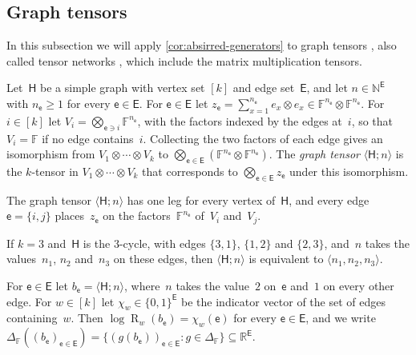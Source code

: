 \documentclass[11pt,letterpaper]{article}
\DeclareMathOperator{\tensorrank}{R}
\newcommand{\FF}{\mathbb{F}}
\newcommand{\RR}{\mathbb{R}}
\newcommand{\NN}{\mathbb{N}}
\begin{document}
\subsection{Graph tensors}\label{sec:graph-tensors}

In this subsection we will apply \cref{cor:absirred-generators} to graph tensors \cite{MR3924627}, also called tensor networks \cite[Definition~12.1]{wigderson2022asymptotic}, which include the matrix multiplication tensors.
\begin{definition}\label{def:graph-tensor}
Let~$\mathsf{H}$ be a simple graph with vertex set $[k]$ and edge set~$\mathsf{E}$, and let $n \in \NN^\mathsf{E}$ with $n_{\mathsf{e}} \geq 1$ for every $\mathsf{e} \in \mathsf{E}$. For $\mathsf{e} \in \mathsf{E}$ let $z_{\mathsf{e}} = \sum_{x=1}^{n_{\mathsf{e}}} e_x \otimes e_x \in \FF^{n_{\mathsf{e}}} \otimes \FF^{n_{\mathsf{e}}}$. For $i \in [k]$ let $V_i = \bigotimes_{\mathsf{e} \ni i} \FF^{n_{\mathsf{e}}}$, with the factors indexed by the edges at~$i$, so that $V_i = \FF$ if no edge contains~$i$. Collecting the two factors of each edge gives an isomorphism from $V_1 \otimes \cdots \otimes V_k$ to $\bigotimes_{\mathsf{e} \in \mathsf{E}} (\FF^{n_{\mathsf{e}}} \otimes \FF^{n_{\mathsf{e}}})$. The \emph{graph tensor} $\langle \mathsf{H}; n \rangle$ is the $k$-tensor in $V_1 \otimes \cdots \otimes V_k$ that corresponds to $\bigotimes_{\mathsf{e} \in \mathsf{E}} z_{\mathsf{e}}$ under this isomorphism.
\end{definition}
The graph tensor $\langle \mathsf{H}; n \rangle$ has one leg for every vertex of~$\mathsf{H}$, and every edge $\mathsf{e} = \{i,j\}$ places~$z_{\mathsf{e}}$ on the factors~$\FF^{n_{\mathsf{e}}}$ of~$V_i$ and~$V_j$.

If $k = 3$ and~$\mathsf{H}$ is the $3$-cycle, with edges $\{3,1\}$, $\{1,2\}$ and $\{2,3\}$, and~$n$ takes the values~$n_1$, $n_2$ and~$n_3$ on these edges, then $\langle \mathsf{H}; n \rangle$ is equivalent to $\langle n_1, n_2, n_3 \rangle$.

For $\mathsf{e} \in \mathsf{E}$ let $b_{\mathsf{e}} = \langle \mathsf{H}; n \rangle$, where~$n$ takes the value~$2$ on~$\mathsf{e}$ and~$1$ on every other edge. For $w \in [k]$ let $\chi_w \in \{0,1\}^\mathsf{E}$ be the indicator vector of the set of edges containing~$w$. Then $\log \tensorrank_w(b_{\mathsf{e}}) = \chi_w(\mathsf{e})$ for every $\mathsf{e} \in \mathsf{E}$, and we write $\Delta_\FF((b_{\mathsf{e}})_{\mathsf{e} \in \mathsf{E}}) = \{ (g(b_{\mathsf{e}}))_{\mathsf{e} \in \mathsf{E}} : g \in \Delta_\FF \} \subseteq \RR^\mathsf{E}$.
\end{document}
